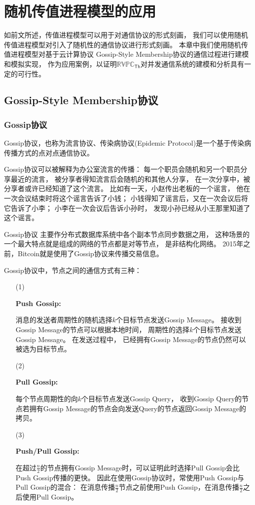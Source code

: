 
\chapter{随机传值进程模型的应用}\label{ch:gossip}

如前文所述，传值进程模型可以用于对通信协议的形式刻画，
我们可以使用随机传值进程模型对引入了随机性的通信协议进行形式刻画。
本章中我们使用随机传值进程模型对基于云计算协议
Gossip-Style Membership协议的通信过程进行建模和模拟实现，
作为应用案例，以证明$\mathbb{RVPC}_{\mathsf{Th}}$对并发通信系统的建模和分析具有一定的可行性。

\section{Gossip-Style Membership协议}
\subsection{Gossip协议}
Gossip协议，也称为流言协议、传染病协议(Epidemic Protocol)是一个基于传染病传播方式的点对点通信协议\cite{Gossip}。

Gossip协议可以被解释为办公室流言的传播：
每一个职员会随机和另一个职员分享最近的流言，
被分享者得知流言后会随机的和其他人分享，
在一次分享中，被分享者或许已经知道了这个流言。
比如有一天，小赵传出老板的一个谣言，
他在一次会议结束时将这个谣言告诉了小钱；
小钱得知了谣言后，又在一次会议后将它告诉了小李；
小李在一次会议后告诉小孙时，
发现小孙已经从小王那里知道了这个谣言。

Gossip协议
主要作分布式数据库系统中各个副本节点同步数据之用，
这种场景的一个最大特点就是组成的网络的节点都是对等节点，
是非结构化网络。
2015年之前，Bitcoin就是使用了Gossip协议来传播交易信息\cite{Bitcoin}。

Gossip协议中，节点之间的通信方式有三种：
\begin{itemize}
   \item[(1)] {
      {\bfseries Push Gossip:} 
      
      消息的发送者周期性的随机选择$k$个目标节点发送Gossip Message。
      接收到Gossip Message的节点可以根据本地时间，
      周期性的选择$k$个目标节点发送Gossip Message。
      在发送过程中，
      已经拥有Gossip Message的节点仍然可以被选为目标节点。
   }
   \item[(2)] {
      {\bfseries Pull Gossip:}

      每个节点周期性的向$k$个目标节点发送Gossip Query，
      收到Gossip Query的节点若拥有Gossip Message的节点会向发送Query的节点返回Gossip Message的拷贝。
   }
   \item[(3)] {
      {\bfseries Push/Pull Gossip:}

      在超过$\frac{n}{2}$的节点拥有Gossip Message时，可以证明此时选择Pull Gossip会比Push Gossip传播的更快\cite{Gossip}。
      因此在使用Gossip协议时，常使用Push Gossip与Pull Gossip的混合：
      在消息传播$\frac{n}{2}$节点之前使用Push Gossip，在消息传播$\frac{n}{2}$之后使用Pull Gossip。
   }
\end{itemize}

